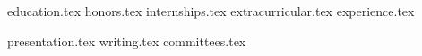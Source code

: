 \documentclass[12pt, a4paper]{awesome-cv}
\newcommand*{\sectiondir}{resume/}
\begin{document}
\makecvheader

% 
{education.tex}
{honors.tex}
{internships.tex}
{extracurricular.tex}
{experience.tex}

{presentation.tex}
{writing.tex}
{committees.tex}
\end{document}
